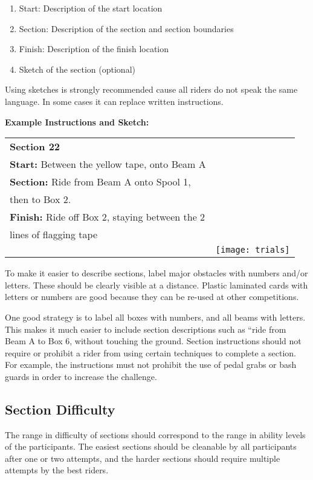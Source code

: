 \begin{enumerate}
\item  Start: Description of the start location
\item Section: Description of the section and section boundaries
\item Finish: Description of the finish location
\item Sketch of the section (optional)
\end{enumerate}
Using sketches is strongly recommended cause all riders do not speak the same language. 
In some cases it can replace written instructions.

\textbf{Example Instructions and Sketch:}
\\
\begin{tabular}{|l r |}
\hline 
\textbf{Section 22} \\
\textbf{Start:} Between the yellow tape, onto Beam A\\
\textbf{Section:} Ride from Beam A onto Spool 1,\\
then to Box 2.\\
\textbf{Finish:} Ride off Box 2, staying between the 2\\
lines of flagging tape\\ & \texttt{[image: trials]} \\ 
 
\hline 
\end{tabular} 

	
To make it easier to describe sections, label major obstacles with numbers and/or letters. 
These should be clearly visible at a distance. 
Plastic laminated cards with letters or numbers are good because they can be re-used at other competitions.

One good strategy is to label all boxes with numbers, and all beams with letters. 
This makes it much easier to include section descriptions such as “ride from Beam A to Box 6, without touching the ground.
Section instructions should not require or prohibit a rider from using certain techniques to complete a section. 
For example, the instructions must not prohibit the use of pedal grabs or bash guards in order to increase the challenge.

\subsection{Section Difficulty}
The range in difficulty of sections should correspond to the range in ability levels of the participants. 
The easiest sections should be cleanable by all participants after one or two attempts, and the harder sections should require
multiple attempts by the best riders.

